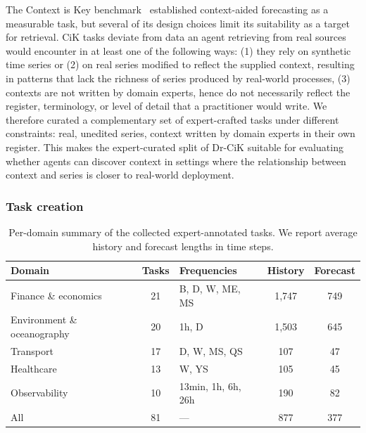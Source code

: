 \documentclass[]{servicenow}
\begin{document}
The Context is Key benchmark~\citep{williams2024context} established context-aided forecasting as a measurable task, but several of its design choices limit its suitability as a target for retrieval.
CiK tasks deviate from data an agent retrieving from real sources would encounter in at least one of the following ways:
(1) they rely on synthetic time series or (2) on real series modified to reflect the supplied context, resulting in patterns that lack the richness of series produced by real-world processes, (3) contexts are not written by domain experts, hence do not necessarily reflect the register, terminology, or level of detail that a practitioner would write.
We therefore curated a complementary set of expert-crafted tasks under different constraints: real, unedited series, context written by domain experts in their own register.
This makes the expert-curated split of Dr-CiK suitable for evaluating whether agents can discover context in settings where the relationship between context and series is closer to real-world deployment.




\subsubsection{Task creation}
\label{app:expert-task-creation}



\begin{table}[h]
\centering
\small
\begin{tabular}{lclcc}
\toprule
\textbf{Domain} & \textbf{Tasks} & \textbf{Frequencies} & \textbf{History} & \textbf{Forecast} \\
\midrule
Finance \& economics       & 21 & B, D, W, ME, MS                 & 1{,}747 & 749 \\
Environment \& oceanography & 20 & 1h, D                          & 1{,}503 & 645 \\
Transport                  & 17 & D, W, MS, QS                    & 107   & 47  \\
Healthcare                 & 13 & W, YS                           & 105   & 45  \\
Observability              & 10 & 13min, 1h, 6h, 26h              & 190   & 82  \\
\midrule
All                        & 81 & ---                             & 877   & 377 \\
\bottomrule
\end{tabular}
\vspace{5pt}
\caption{Per-domain summary of the collected expert-annotated tasks. We report average history and forecast lengths in time steps.}
\label{tab:domain-summary}
\end{table}
\end{document}
